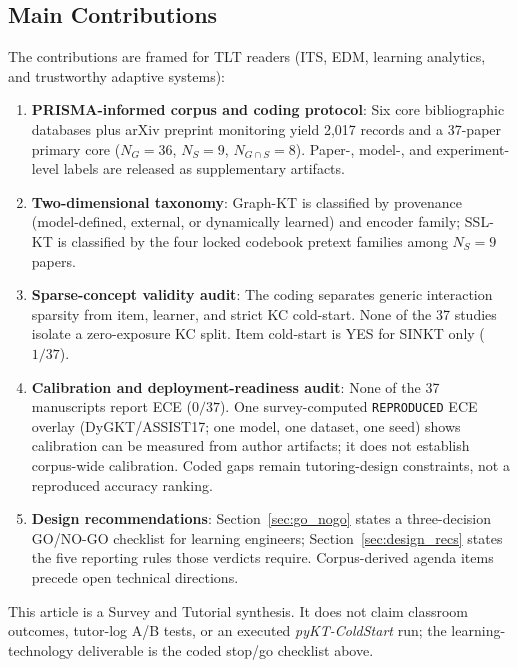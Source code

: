 \documentclass[lettersize,journal]{IEEEtran}
\begin{document}
\subsection{Main Contributions}
The contributions are framed for TLT readers (ITS, EDM, learning analytics, and trustworthy adaptive systems):
\begin{enumerate}
    \item \textbf{PRISMA-informed corpus and coding protocol}: Six core bibliographic databases plus arXiv preprint monitoring yield 2,017 records and a 37-paper primary core ($N_G=36$, $N_S=9$, $N_{G \cap S}=8$). Paper-, model-, and experiment-level labels are released as supplementary artifacts.
    \item \textbf{Two-dimensional taxonomy}: Graph-KT is classified by provenance (model-defined, external, or dynamically learned) and encoder family; SSL-KT is classified by the four locked codebook pretext families among $N_S=9$ papers.
    \item \textbf{Sparse-concept validity audit}: The coding separates generic interaction sparsity from item, learner, and strict KC cold-start. None of the 37 studies isolate a zero-exposure KC split. Item cold-start is YES for SINKT only ($1/37$).
    \item \textbf{Calibration and deployment-readiness audit}: None of the 37 manuscripts report ECE ($0/37$). One survey-computed \texttt{REPRODUCED} ECE overlay (DyGKT/ASSIST17; one model, one dataset, one seed) shows calibration can be measured from author artifacts; it does not establish corpus-wide calibration. Coded gaps remain tutoring-design constraints, not a reproduced accuracy ranking.
    \item \textbf{Design recommendations}: Section~\ref{sec:go_nogo} states a three-decision GO/NO-GO checklist for learning engineers; Section~\ref{sec:design_recs} states the five reporting rules those verdicts require. Corpus-derived agenda items precede open technical directions.
\end{enumerate}

This article is a Survey and Tutorial synthesis. It does not claim classroom outcomes, tutor-log A/B tests, or an executed \emph{pyKT-ColdStart} run; the learning-technology deliverable is the coded stop/go checklist above.

\end{document}
